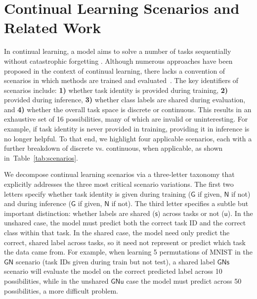 \documentclass{article}
\newcommand{\casename}[1]{\ensuremath{\mathsf{#1}}\xspace}
\newcommand{\tabref}[1]{Table~\ref{tab:#1}}
\begin{document}
\vspace*{-1ex}
\section{Continual Learning Scenarios and Related Work}
\label{sec:cl}
\vspace*{-1ex}

In continual learning, a model aims to solve a number of tasks sequentially \cite{thrun1998lifelong, zhao1996incremental} without catastrophic forgetting \cite{french1999catastrophic, kirkpatrick2017overcoming, mccloskey1989catastrophic}.
Although numerous approaches have been proposed in the context of continual learning, there lacks a convention of  scenarios in which methods are trained and evaluated~\cite{van2019three}. The key identifiers of scenarios include: \textbf{1)} whether task identity is provided during training, \textbf{2)} provided during inference, \textbf{3)} whether class labels are shared during evaluation, 
and \textbf{4)} whether the overall task space is discrete or continuous.
This results in an exhaustive set of 16 possibilities, many of which are invalid or uninteresting. For example, 
if task identity is never provided in training, providing it in inference is no longer helpful.
To that end, we highlight four applicable scenarios, each with a further breakdown of discrete vs. continuous, when applicable, as shown in~\tabref{scenarios}.

We decompose continual learning scenarios via a three-letter taxonomy that explicitly addresses the three most critical scenario variations. 
The first two letters specify whether task identity is given during training (\casename{G} if given, \casename{N} if not) and during inference (\casename{G} if given, \casename{N} if not).
The third letter specifies a subtle but important distinction: whether labels are shared (\casename{s}) across tasks or not (\casename{u}).
In the unshared case, the model must predict both the correct task ID and the correct class within that task. In the shared case, the model need only predict the correct, shared label across tasks, so it need not represent or predict which task the data came from.
For example, when learning 5 permutations of MNIST in the \casename{GN} scenario (task IDs given during train but not test), a shared label \casename{GNs} scenario will evaluate the model on the correct predicted label across 10 possibilities, while in the unshared \casename{GNu} case the model must predict across 50 possibilities, a more difficult problem.
\end{document}
